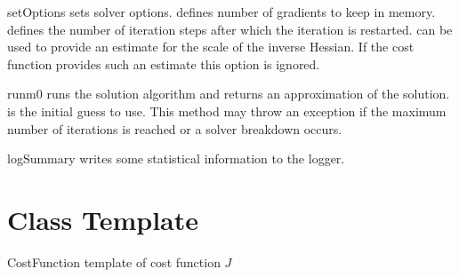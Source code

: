 \begin{methoddesc}[MinimizerLBFGS]{setOptions}{%
%
%
}
sets solver options.  defines number of gradients to keep in memory.
 defines the number of iteration steps after which the iteration is restarted.
 can be used to provide an estimate for the scale of 
the inverse Hessian. If the cost function provides such an estimate this
option is ignored.
\end{methoddesc}

\begin{methoddesc}[MinimizerLBFGS]{run}{m0}
runs the solution algorithm and returns an approximation of the solution.
 is the initial guess to use.
This method may throw an exception if the maximum number of iterations is
reached or a solver breakdown occurs.
\end{methoddesc}

\begin{methoddesc}[MinimizerLBFGS]{logSummary}{}
writes some statistical information to the logger.
\end{methoddesc}

\section{ Class Template}\label{chapter:ref:Minimization: costfunction class}

\begin{classdesc}{CostFunction}{}
template of cost function $J$
\end{classdesc}

